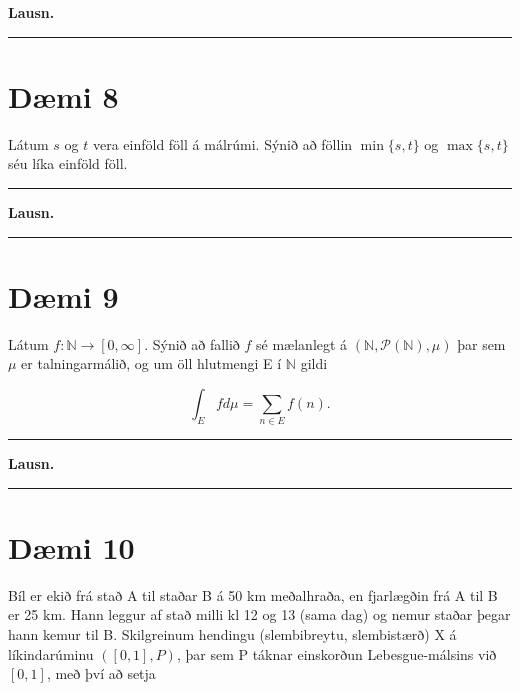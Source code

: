 \documentclass[]{book}
\begin{document}
\textbf{Lausn.}

\begin{center}\rule{0.5\linewidth}{\linethickness}\end{center}

\hypertarget{dmi-8-1}{%
\section*{Dæmi 8}\label{dmi-8-1}}

Látum \(s\) og \(t\) vera einföld föll á málrúmi. Sýnið að föllin \(\min\{s, t\}\) og \(\max\{s, t\}\) séu líka einföld föll.

\begin{center}\rule{0.5\linewidth}{\linethickness}\end{center}

\textbf{Lausn.}

\begin{center}\rule{0.5\linewidth}{\linethickness}\end{center}

\hypertarget{dmi-9-1}{%
\section*{Dæmi 9}\label{dmi-9-1}}

Látum \(f: \mathbb N \rightarrow [0, \infty]\). Sýnið að fallið \(f\) sé mælanlegt á \((\mathbb N, \mathcal P(\mathbb N), \mu)\) þar sem \(\mu\) er talningarmálið, og um öll hlutmengi E í \(\mathbb N\) gildi

\[
\int_E f d\mu = \sum_{n\in E}f(n).
\]

\begin{center}\rule{0.5\linewidth}{\linethickness}\end{center}

\textbf{Lausn.}

\begin{center}\rule{0.5\linewidth}{\linethickness}\end{center}

\hypertarget{dmi-10}{%
\section*{Dæmi 10}\label{dmi-10}}

Bíl er ekið frá stað A til staðar B á 50 km meðalhraða, en fjarlægðin frá A til B er 25 km. Hann leggur af stað milli kl 12 og 13 (sama dag) og nemur staðar þegar hann kemur til B. Skilgreinum hendingu (slembibreytu, slembistærð) X á líkindarúminu \(([0, 1], P)\), þar sem P táknar einskorðun Lebesgue-málsins við \([0, 1]\), með því að setja
\end{document}
